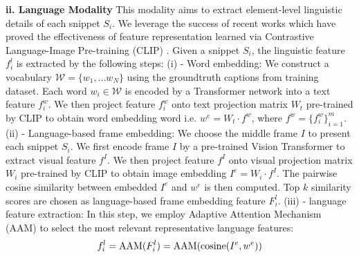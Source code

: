 \documentclass{article}
\begin{document}
\noindent
\textbf{ii. Language Modality} 
This modality aims to extract element-level linguistic details of each snippet $S_i$. We leverage the success of recent works \cite{Patashnik2021styleclip, Yang2021} which have proved the effectiveness of feature representation learned via Contrastive Language-Image Pre-training (CLIP) \cite{radford2021learning}. Given a snippet $S_i$, the linguistic feature $f_i^l$ is extracted by the following steps: (i) - Word embedding: We construct a vocabulary $\mathcal{W} = \{w_1, \dots w_N\}$ using the groundtruth captions from training dataset. Each word $w_i\in \mathcal{W}$ is encoded by a Transformer network \cite{vaswani2017attention} into a text feature $f_i^w$. We then project feature $f_i^w$ onto text projection matrix $W_t$ pre-trained by CLIP to obtain word embedding word i.e. $w^e =  W_t \cdot f^w$, where $f^w = \{f_i^w\}_{i=1}^{m}$. (ii) - Language-based frame embedding: We choose the middle frame $I$ to present each snippet $S_i$. We first encode frame $I$ by a pre-trained Vision Transformer \cite{dosovitskiy2020image} to extract visual feature $f^I$. We then project feature $f^I$ onto visual projection matrix $W_i$ pre-trained by CLIP to obtain image embedding $I^e =  W_i\cdot f^I$. The pairwise cosine similarity between embedded $I^e$ and $w^e$ is then computed. Top $k$ similarity scores are chosen as language-based frame embedding feature $F_i^l$. (iii) -  language feature extraction: In this step, we employ Adaptive Attention Mechanism (AAM) \cite{vo2021aei} to select the most relevant representative language features:
\vspace{-1.2mm}
\begin{equation}
f_i^{l} = \text{AAM}(F_i^l) = \text{AAM}(\text{cosine}(I^e, w^e))
\vspace{-1.2mm}
\end{equation}
\end{document}
